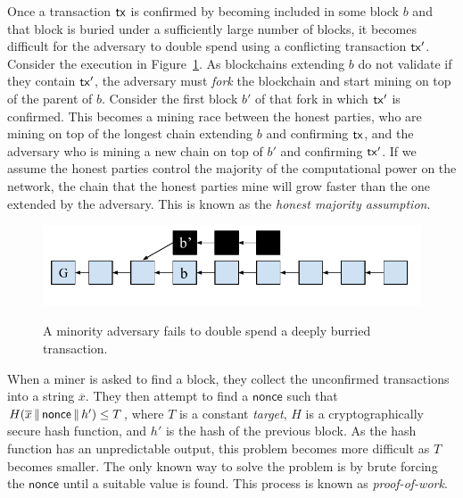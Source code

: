 Once a transaction $\mathsf{tx}$ is confirmed by becoming included in some block $b$ and
that block is buried under a sufficiently large number of blocks, it
becomes difficult for the adversary to double spend using a conflicting
transaction $\mathsf{tx}'$. Consider the execution in Figure~\ref{fig.adversary-race}.
As blockchains extending $b$ do not validate if they
contain $\mathsf{tx}'$, the adversary must \emph{fork} the blockchain and start mining
on top of the parent of $b$. Consider the first block $b'$ of that fork in which
$\mathsf{tx}'$ is confirmed. This becomes a mining race between the honest parties, who
are mining on top of the longest chain extending $b$ and confirming $\mathsf{tx}$, and
the adversary who is mining a new chain on top of $b'$ and confirming $\mathsf{tx}'$. If
we assume the honest parties control the majority of the computational power on
the network, the chain that the honest parties mine will grow faster than the
one extended by the adversary. This is known as the \emph{honest majority
assumption}.

\begin{figure}[h]
    \caption{
    A minority adversary fails to double spend a deeply burried transaction.
    }
    \centering
    \includegraphics[width=0.7\columnwidth,keepaspectratio]{chapters/introduction/figures/adversary-race.pdf}
    \label{fig.adversary-race}
\end{figure}

When a miner is asked to find a block, they collect the unconfirmed transactions
into a string $\overline{x}$. They then attempt to find a $\textsf{nonce}$ such
that $H(\overline{x} \,\|\, \textsf{nonce} \,\|\, h') \leq T$, where $T$ is a constant
\emph{target}, $H$ is a cryptographically secure hash function, and $h'$ is the
hash of the previous block. As the hash
function has an unpredictable output, this problem becomes more difficult as $T$
becomes smaller. The only known way to solve the problem is by brute forcing the
$\textsf{nonce}$ until a suitable value is found. This process is known as
\emph{proof-of-work}.

